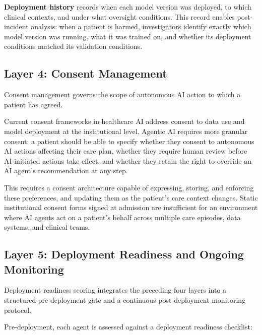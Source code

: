 \documentclass[11pt]{article}
\begin{document}
\textbf{Deployment history} records when each model version was
deployed, to which clinical contexts, and under what oversight
conditions. This record enables post-incident analysis: when a patient
is harmed, investigators identify exactly which model version was
running, what it was trained on, and whether its deployment conditions
matched its validation conditions.

\subsection{Layer 4: Consent Management}\label{layer-4-consent-management}

Consent management governs the scope of autonomous AI action to which a
patient has agreed.

Current consent frameworks in healthcare AI address consent to data use
and model deployment at the institutional level. Agentic AI requires
more granular consent: a patient should be able to specify whether they
consent to autonomous AI actions affecting their care plan, whether they
require human review before AI-initiated actions take effect, and
whether they retain the right to override an AI agent's recommendation
at any step.

This requires a consent architecture capable of expressing, storing, and
enforcing these preferences, and updating them as the patient's care
context changes. Static institutional consent forms signed at admission
are insufficient for an environment where AI agents act on a patient's
behalf across multiple care episodes, data systems, and clinical teams.

\subsection{Layer 5: Deployment Readiness and Ongoing Monitoring}\label{layer-5-deployment-readiness-and-ongoing-monitoring}

Deployment readiness scoring integrates the preceding four layers into a
structured pre-deployment gate and a continuous post-deployment
monitoring protocol.

Pre-deployment, each agent is assessed against a deployment readiness
checklist:
\end{document}
